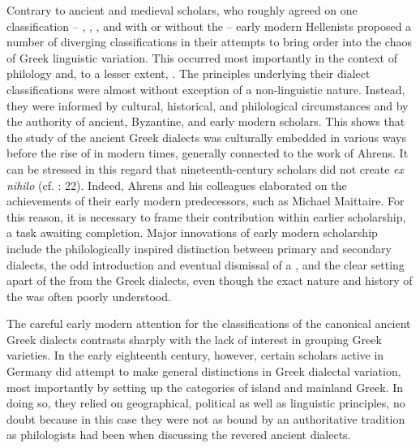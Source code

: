Contrary to ancient and medieval scholars, who roughly agreed on one classification – , , , and  with or without the  – early modern Hellenists proposed a number of diverging classifications in their attempts to bring order into the chaos of Greek linguistic variation. This occurred most importantly in the context of philology and, to a lesser extent, . The principles underlying their dialect classifications were almost without exception of a non-linguistic nature. Instead, they were informed by cultural, historical, and philological circumstances and by the authority of ancient, Byzantine, and early modern scholars. This shows that the study of the ancient Greek dialects was culturally embedded in various ways before the rise of   in modern times, generally connected to the work of Ahrens. It can be stressed in this regard that nineteenth-century scholars did not create   \textit{ex nihilo} (cf. \citealt{Colvin2007}: 22). Indeed, Ahrens and his colleagues elaborated on the achievements of their early modern predecessors, such as Michael Maittaire. For this reason, it is necessary to frame their contribution within earlier scholarship, a task awaiting completion. Major innovations of early modern scholarship include the philologically inspired distinction between primary and secondary dialects, the odd introduction and eventual dismissal of a , and the clear setting apart of the  from the Greek dialects, even though the exact nature and history of the  was often poorly understood.

The careful early modern attention for the classifications of the canonical ancient Greek dialects contrasts sharply with the lack of interest in grouping  Greek varieties. In the early eighteenth century, however, certain scholars active in Germany did attempt to make general distinctions in  Greek dialectal variation, most importantly by setting up the categories of island and mainland Greek. In doing so, they relied on geographical, political as well as linguistic principles, no doubt because in this case they were not as bound by an authoritative tradition as philologists had been when discussing the revered ancient dialects.

